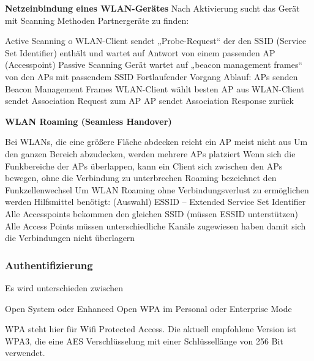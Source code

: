 \documentclass[asp1.tex]{subfiles}
\begin{document}
\textbf{Netzeinbindung eines WLAN-Gerätes}
Nach Aktivierung sucht das Gerät mit Scanning Methoden Partnergeräte zu finden:
\begin{outline}
    \1 Active Scanning
        o	WLAN-Client sendet „Probe-Request“ der den SSID (Service Set Identifier) enthält und wartet auf Antwort von einem passenden AP (Accesspoint)
    \1 Passive Scanning
        \2 Gerät wartet auf „beacon management frames“ von den APs mit passendem SSID
        \2 Fortlaufender Vorgang
        \2 Ablauf:
                \3 APs senden Beacon Management Frames
                \3 WLAN-Client wählt besten AP aus
                \3 WLAN-Client sendet Association Request zum AP
                \3 AP sendet Association Response zurück
\end{outline}

\textbf{WLAN Roaming (Seamless Handover)}

\begin{outline}
    \1 Bei WLANs, die eine größere Fläche abdecken reicht ein AP meist nicht aus
    \1 Um den ganzen Bereich abzudecken, werden mehrere APs platziert
    \1 Wenn sich die Funkbereiche der APs überlappen, kann ein Client sich zwischen den APs bewegen, ohne die Verbindung zu unterbrechen
    \1 Roaming bezeichnet den Funkzellenwechsel
    \1 Um WLAN Roaming ohne Verbindungsverlust zu ermöglichen werden Hilfsmittel benötigt: (Auswahl)
        \2 ESSID – Extended Service Set Identifier
            \3 \textrightarrow\space Alle Accesspoints bekommen den gleichen SSID (müssen ESSID unterstützen)
            \3 Alle Access Points müssen unterschiedliche Kanäle zugewiesen haben damit sich die Verbindungen nicht überlagern
\end{outline}


\subsubsection{Authentifizierung}

Es wird unterschieden zwischen
\begin{outline}
    \1 Open System oder Enhanced Open
    \1 WPA im Personal oder Enterprise Mode
\end{outline}

WPA steht hier für Wifi Protected Access. Die aktuell empfohlene Version ist WPA3, die eine AES Verschlüsselung mit einer Schlüssellänge von 256 Bit verwendet.
\end{document}
